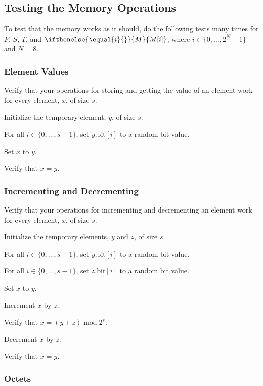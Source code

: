 \documentclass[a4paper,12pt]{article}
\newcommand{\MEM}[1]{\ifthenelse{\equal{#1}{}}{M}{M[#1]}}
\newcommand{\PC}{P}
\newcommand{\SP}{S}
\newcommand{\TERM}{T}
\newcommand{\bitno}[2]{#1.\mathrm{bit}[#2]}
\newcommand{\range}[2]{\{#1,\ldots,#2\}}
\DeclareMathOperator{\MOD}{mod}
\newcommand{\modulo}[2]{#1 \MOD #2}
\begin{document}
\subsection{Testing the Memory Operations}

To test that the memory works as it should, do the following tests many times for $\PC$, $\SP$, $\TERM$, and $\MEM{i}$, where $i \in \range{0}{2^N-1}$ and $N=8$.

\subsubsection{Element Values}

Verify that your operations for storing and getting the value of an element work for every element, $x$, of size $s$.
\begin{stepnumbers}
\item Initialize the temporary element, $y$, of size $s$.
\item For all $i \in \range{0}{s-1}$, set $\bitno{y}{i}$ to a random bit value.
\item Set $x$ to $y$.
\item Verify that $x = y$.
\end{stepnumbers}

\subsubsection{Incrementing and Decrementing}

Verify that your operations for incrementing and decrementing an element work for every element, $x$, of size $s$.
\begin{stepnumbers}
\item Initialize the temporary elements, $y$ and $z$, of size $s$.
\item For all $i \in \range{0}{s-1}$, set $\bitno{y}{i}$ to a random bit value.
\item For all $i \in \range{0}{s-1}$, set $\bitno{z}{i}$ to a random bit value.
\item Set $x$ to $y$.
\item Increment $x$ by $z$.
\item Verify that $x = \modulo{(y + z)}{2^s}$.
\item Decrement $x$ by $z$.
\item Verify that $x = y$.
\end{stepnumbers}

\subsubsection{Octets}
\end{document}
